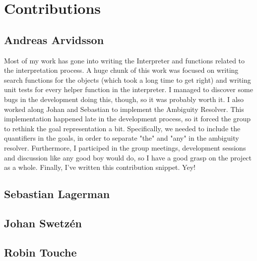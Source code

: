 \section*{Contributions}
\subsection*{Andreas Arvidsson}
Most of my work has gone into writing the Interpreter and functions related to the interpretation process.
A huge chunk of this work was focused on writing search functions for the objects (which took a long time to get right) and writing unit tests for every helper function in the interpreter.
I managed to discover some bugs in the development doing this, though, so it was probably worth it.
I also worked along Johan and Sebastian to implement the Ambiguity Resolver. This implementation happened late in the development process, so it forced the group to rethink the goal representation a bit. Specifically, we needed to include the quantifiers in the goals, in order to separate "the" and "any" in the ambiguity resolver.
Furthermore, I participed in the group meetings, development sessions and discussion like any good boy would do, so I have a good grasp on the project as a whole.
Finally, I've written this contribution snippet. Yey!

\subsection*{Sebastian Lagerman}
\subsection*{Johan Swetz\'en}
\subsection*{Robin Touche}
